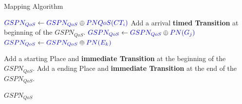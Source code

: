 \documentclass[xcolor=svgnames]{beamer}
\begin{document}
\begin{frame}{Mapping Algorithm}
\begin{algorithm}[H]
\begin{algorithmic}
{{	      %

		\STATE $\textcolor{componentColor}{ GSPN_{QoS} } \leftarrow \textcolor{componentColor}{ GSPN_{QoS} } \oplus \textcolor{componentColor}{ PNQoS(CT_i) } $  		
		 \STATE Add a arrival \textbf{timed Transition} at beginning of the \textcolor{componentColor}{$GSPN_{QoS}$}.
	     \ENDFOR
		\STATE $\textcolor{componentColor}{ GSPN_{QoS} } \leftarrow \textcolor{componentColor}{GSPN_{QoS}} \oplus \textcolor{componentColor}{ PN(G_j) }$	
	    \ENDFOR	
		\STATE $\textcolor{componentColor}{ GSPN_{QoS} } \leftarrow \textcolor{componentColor}{ GSPN_{QoS} } \oplus \textcolor{componentColor}{ PN(E_k) }$  	
	    \ENDFOR

	    \STATE Add a starting Place and \textbf{immediate Transition} at the beginning of the \textcolor{componentColor}{ $GSPN_{QoS}$}.	
	    \STATE Add a ending Place and \textbf{immediate Transition} at the end of the \textcolor{componentColor}{$GSPN_{QoS}$}.	

	    \RETURN \textcolor{componentColor}{$GSPN_{QoS}$}
  }
}	
	
	\end{algorithmic}

      \end{algorithm}


  \end{frame}
\end{document}
